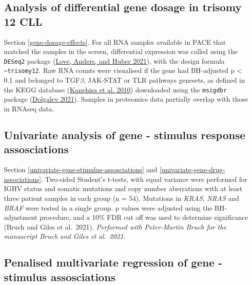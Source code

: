 \documentclass[11pt, a4paper, twosided]{book}
\begin{document}
\hypertarget{gene-dosage-effects-method}{%
\subsection{Analysis of differential gene dosage in trisomy 12 CLL}\label{gene-dosage-effects-method}}

Section \ref{gene-dosage-effects}. For all RNA samples available in PACE that matched the samples in the screen, differential expression was called using the \texttt{DESeq2} package (\protect\hyperlink{ref-R-DESeq2}{Love, Anders, and Huber 2021}), with the design formula \texttt{\textasciitilde{}trisomy12}. Raw RNA counts were visualised if the gene had BH-adjusted p \textless{} 0.1 and belonged to TGF\(\beta\), JAK-STAT or TLR pathways genesets, as defined in the KEGG database (\protect\hyperlink{ref-KEGG}{Kanehisa et al. 2010}) downloaded using the \texttt{msigdbr} package (\protect\hyperlink{ref-R-msigdbr}{Dolgalev 2021}). Samples in proteomics data partially overlap with those in RNAseq data.

\hypertarget{univariate-gene-stimulus-associations-method}{%
\subsection{Univariate analysis of gene - stimulus response assosciations}\label{univariate-gene-stimulus-associations-method}}

Section \ref{univariate-gene-stimulus-assosciations} and \ref{univariate-gene-drug-associations}. Two-sided Student's t-tests, with equal variance were performed for IGHV status and somatic mutations and copy number aberrations with at least three patient samples in each group (n = 54). Mutations in \emph{KRAS}, \emph{NRAS} and \emph{BRAF} were tested in a single group. p values were adjusted using the BH-adjustment procedure, and a 10\% FDR cut off was used to determine significance (Bruch and Giles et al.~2021). \emph{Performed with Peter-Martin Bruch for the manuscript Bruch and Giles et al.~2021.}

\hypertarget{multivariate-gene-stimulus-assosciations-method}{%
\subsection{Penalised multivariate regression of gene - stimulus assosciations}\label{multivariate-gene-stimulus-assosciations-method}}
\end{document}
